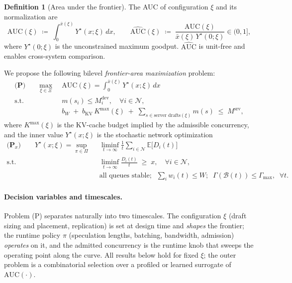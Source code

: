 \documentclass[11pt]{article}
\theoremstyle{definition}
\newtheorem{definition}{Definition}
\theoremstyle{remark}
\newcommand{\E}{\mathbb{E}}
\newcommand{\cN}{\mathcal{N}}
\newcommand{\cB}{\mathcal{B}}
\newcommand{\auc}{\mathrm{AUC}}
\newcommand{\nauc}{\widehat{\mathrm{AUC}}}
\begin{document}
\begin{definition}[Area under the frontier]\label{def:auc}
The AUC of configuration $\xi$ and its normalization are
\begin{equation}\label{eq:auc}
\auc(\xi)\;\coloneqq\;\int_{0}^{\bar{x}(\xi)}Y^{\star}(x;\xi)\,dx,
\qquad
\nauc(\xi)\;\coloneqq\;\frac{\auc(\xi)}{\bar{x}(\xi)\,Y^{\star}(0;\xi)}\in(0,1],
\end{equation}
where $Y^{\star}(0;\xi)$ is the unconstrained maximum goodput. $\nauc$ is
unit-free and enables cross-system comparison.
\end{definition}

We propose the following bilevel \emph{frontier-area maximization} problem:
\begin{align}
\textbf{(P)}\qquad
\max_{\xi\in\Xi}\;\; & \auc(\xi)=\int_{0}^{\bar{x}(\xi)}Y^{\star}(x;\xi)\,dx
\label{eq:P}\\
\text{s.t.}\;\;
& m(s_i)\le M_i^{\mathrm{dev}},\quad \forall i\in\cN, \nonumber\\
& b_W \;+\; b_{\mathrm{KV}}\,K^{\max}(\xi)
\;+\;\textstyle\sum_{s\in\text{server drafts}(\xi)}m(s)\;\le\; M^{\mathrm{srv}},
\nonumber
\end{align}
where $K^{\max}(\xi)$ is the KV-cache budget implied by the admissible
concurrency, and the inner value $Y^{\star}(x;\xi)$ is the stochastic network
optimization
\begin{align}
\textbf{(P$_x$)}\qquad
Y^{\star}(x;\xi)=\sup_{\pi\in\Pi}\;\;
& \liminf_{t\to\infty}\frac{1}{t}\sum_{i\in\cN}\E\bigl[D_i(t)\bigr]
\label{eq:Px}\\
\text{s.t.}\;\;
& \liminf_{t\to\infty}\frac{D_i(t)}{t}\;\ge\;x,\quad\forall i\in\cN,
\nonumber\\
& \text{all queues stable};\;\;
\textstyle\sum_i w_i(t)\le W;\;\;
\Gamma(\cB(t))\le\Gamma_{\max},\;\;\forall t. \nonumber
\end{align}

\paragraph{Decision variables and timescales.}
Problem (P) separates naturally into two timescales. The configuration $\xi$
(draft sizing and placement, replication) is set at design time and
\emph{shapes} the frontier; the runtime policy $\pi$ (speculation lengths,
batching, bandwidth, admission) \emph{operates} on it, and the admitted
concurrency is the runtime knob that sweeps the operating point along the
curve. All results below hold for fixed $\xi$; the outer problem is a
combinatorial selection over a profiled or learned surrogate of
$\auc(\cdot)$.
\end{document}
